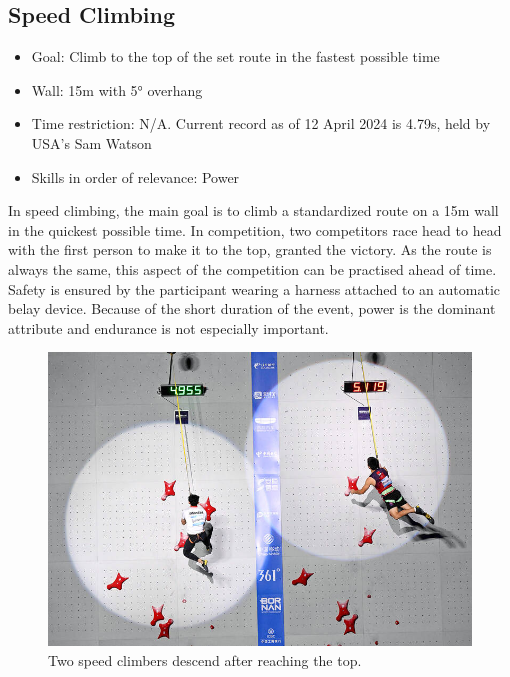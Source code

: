 \subsection{Speed Climbing}
\begin{itemize}
    \item Goal: Climb to the top of the set route in the fastest possible time
    \item Wall: 15m with 5° overhang
    \item Time restriction: N/A. Current record as of 12 April 2024 is 4.79s, held by USA’s Sam Watson \citep{Fast2024}
    \item Skills in order of relevance: Power
\end{itemize}
In speed climbing, the main goal is to climb a standardized route on a  15m wall in the quickest possible time. In competition, two competitors race head to head with the first person to make it to the top, granted the victory. As the route is always the same, this aspect of the competition can be practised ahead of time. Safety is ensured by the participant wearing a harness attached to an automatic belay device. Because of the short duration of the event, power is the dominant attribute and endurance is not especially important.
\begin{figure}[H]
    \centering
    \includegraphics[width=0.9\linewidth]{figs/speed_climbing.jpg}
    \caption{Two speed climbers descend after reaching the top. \citep{Taipei_Times_2023}}
\end{figure}


